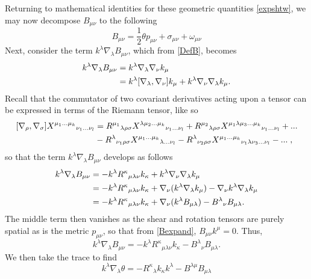  Returning to mathematical identities for these geometric quantities \eqref{expshtw}, we may now decompose $B_{\mu\nu}$ to the following
\[
\label{Bexpand}
B_{\mu\nu}=\frac{1}{2}\theta p_{\mu\nu}+\sigma_{\mu\nu}+\omega_{\mu\nu}
 \]
Next, consider the term $k^{\lambda}\nabla_{\lambda}B_{\mu\nu}$, which from \eqref{DefB}, becomes
\begin{align}\nonumber
k^{\lambda}\nabla_{\lambda}B_{\mu\nu}	&=	k^{\lambda}\nabla_{\lambda}\nabla_{\nu}k_{\mu}
	\\&=	k^{\lambda}[\nabla_{\lambda},\nabla_{\nu}]k_{\mu}+k^{\lambda}\nabla_{\nu}\nabla_{\lambda}k_{\mu}
	.\end{align}
Recall that the commutator of two covariant derivatives acting upon a tensor can be expressed in terms of the Riemann tensor, like so 
\begin{align}
\label{CommRiem}
[\nabla_{\rho},\nabla_{\sigma}]X^{\mu_{1}...\mu_{k}}{ }{ }{ }{ }_{\nu_{1}...\nu_{l}}	&=	R^{\mu_{1}}{ }_{\lambda\rho\sigma}X^{\lambda\mu_{2}...\mu_{k}}{ }{ }{ }{ }_{\nu_{1}...\nu_{l}}+R^{\mu_{2}}{ }_{\lambda\rho\sigma} X^{\mu_{1}\lambda\mu_{3}...\mu_{k}}{ }{ }{ }{ }_{\nu_{1}...\nu_{l}}+...
	\nonumber	\\&-R^{\lambda}{ }_{\nu_{1}\rho\sigma} X^{\mu_{1}...\mu_{k}}{ }{ }{ }{ }_{\lambda...\nu_{l}}-R^{\lambda}{ }_{\nu_{2}\rho\sigma}X^{\mu_{1}...\mu_{k}}{ }{ }{ }{ }_{\nu_{1}\lambda\nu_{3}...\nu_{l}}-...\;,
		\end{align}
	so that the term $k^{\lambda}\nabla_{\lambda}B_{\mu\nu}$ develops as follows
 \begin{align}
	k^{\lambda}\nabla_{\lambda}B_{\mu\nu} &=	-k^{\lambda}R^{\kappa}{ }_{\mu\lambda\nu}k_{\kappa}+k^{\lambda}\nabla_{\nu}\nabla_{\lambda}k_{\mu}
	\nonumber\\&=	-k^{\lambda}R^{\kappa}{ }_{\mu\lambda\nu}k_{\kappa}+\nabla_{\nu}(k^{\lambda}\nabla_{\lambda}k_{\mu})-\nabla_{\nu}k^{\lambda}\nabla_{\lambda}k_{\mu}
	\nonumber\\&=	-k^{\lambda}R^{\kappa}{ }_{\mu\lambda\nu}k_{\kappa}+\nabla_{\nu}(k^{\lambda}B_{\mu\lambda})-B^{\lambda}{ }_{\nu}B_{\mu\lambda}.
 \end{align}
The middle term then vanishes as the shear and rotation tensors are purely spatial as is the metric $p_{\mu\nu}$, so that from \eqref{Bexpand}, $B_{\mu\nu}k^\mu=0$. Thus,
\[
\label{preraych}
k^{\lambda}\nabla_{\lambda}B_{\mu\nu}=-k^{\lambda}R^{\kappa}{ }_{\mu\lambda\nu}k_{\kappa}-B^{\lambda}{ }_{\nu}B_{\mu\lambda}
. \]
We then take the trace to find
\[
k^{\lambda}\nabla_{\lambda}\theta	=	-R^{\kappa}{ }_{\lambda}k_{\kappa}k^{\lambda}-B^{\lambda\mu}B_{\mu\lambda}
 \]
